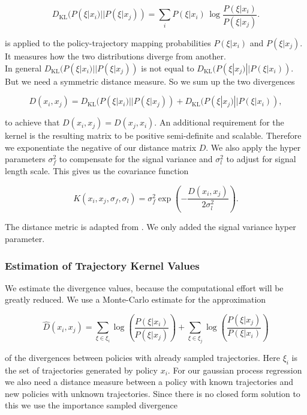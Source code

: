 $$D_{\mathrm {KL} }(P(\xi|x_{ i })||P(\xi|x_{ j })) = \sum _{i}P(\xi|x_{ i })\,\log {\frac {P(\xi|x_{ i })}{P(\xi|x_{ j })}}.$$

is applied to the policy-trajectory mapping probabilities $P(\xi|x_{ i })$ and $P(\xi|x_{ j })$. It measures how the two distributions diverge from another.\\

In general $D_{\mathrm {KL} }(P(\xi|x_{ i })||P(\xi|x_{ j }))$ is not equal to $D_{\mathrm {KL} }(P(\xi|x_{ j })||P(\xi|x_{ i }))$. But we need a symmetric distance measure. So we sum up the two divergences

$$D(x_{ i }, x_{ j }) = D_{\mathrm {KL} }(P(\xi|x_{ i })||P(\xi|x_{ j })) + D_{\mathrm {KL} }(P(\xi|x_{ j })||P(\xi|x_{ i })),$$

to achieve that $D(x_{ i }, x_{ j }) = D(x_{ j }, x_{ i })$. An additional requirement for the kernel is the resulting matrix to be positive semi-definite and scalable\cite{wilson2014using}. Therefore we exponentiate the negative of our distance matrix $D$. We also apply the hyper parameters $\sigma_f^2$ to compensate for the signal variance and $\sigma_l^2$ to adjust for signal length scale. This gives us the covariance function

\begin{equation} \label{eq:trajKernel}
K(x_{ i },x_{ j },\sigma_f,\sigma_l) = \sigma_f^2 \exp\left(-\frac{D(x_i,x_j)}{2\sigma_l^2} \right).
\end{equation}

The distance metric is adapted from \cite{wilson2014using}. We only added the signal variance hyper parameter.

\subsubsection{Estimation of Trajectory Kernel Values}
We estimate the divergence values, because the computational effort will be greatly reduced\cite{wilson2014using}. We use a Monte-Carlo estimate for the approximation

\begin{equation} \label{eq:tk:mc}
    \hat{D}(x_{ i }, x_{ j }) = \sum _{\xi \in \xi_i} \log\left( \frac{P(\xi|x_{ i })}{P(\xi|x_{ j })} \right) + \sum _{\xi \in \xi_j} \log\left( \frac{P(\xi|x_{ j })}{P(\xi|x_{ i })} \right)
\end{equation}

of the divergences between policies with already sampled trajectories. Here $\xi_i$ is the set of trajectories generated by policy $x_i$. For our gaussian process regression we also need a distance measure between a policy with known trajectories and new policies with unknown trajectories. Since there is no closed form solution to this we use the importance sampled divergence

